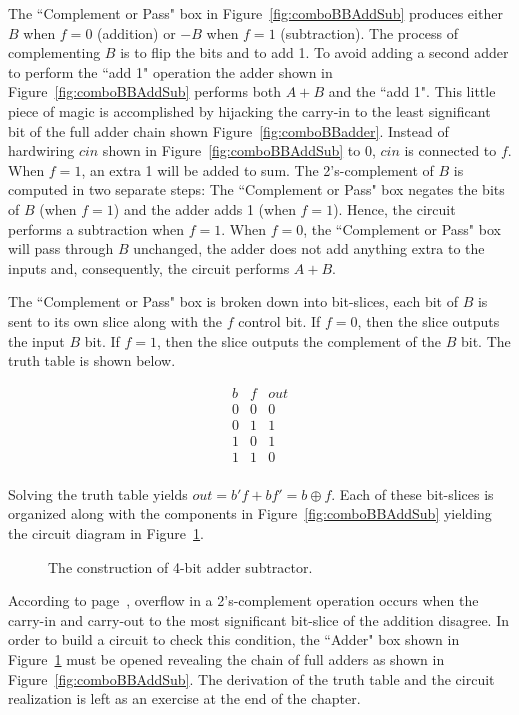 The ``Complement or Pass" box in Figure~\ref{fig:comboBBAddSub} produces 
either $B$ when $f=0$ (addition) or $-B$ when $f=1$ (subtraction).
The process of complementing $B$ is to flip the bits and to add 1.
To avoid adding a second adder to perform the ``add 1" 
operation the adder shown in Figure~\ref{fig:comboBBAddSub} performs 
both $A+B$ and the ``add 1".  This little piece of magic is 
accomplished by hijacking the carry-in to the least significant 
bit of the full adder chain shown Figure~\ref{fig:comboBBadder}.  Instead
of hardwiring $cin$ shown in Figure~\ref{fig:comboBBAddSub} to 0, $cin$ is 
connected to $f$.  
When $f=1$, an extra 1 will be added to sum. The 2's-complement of
$B$ is computed in two separate steps: The ``Complement or Pass" box 
negates the bits of $B$ (when $f=1$) and the adder adds 1
(when $f=1$). Hence, the circuit performs a subtraction when $f=1$.
When $f=0$, the ``Complement or Pass" box will pass through $B$
unchanged, the adder does not add anything extra to the inputs and,
consequently, the circuit performs $A+B$.

The ``Complement or Pass" box is broken down into bit-slices, each
bit of $B$ is sent to its own slice along with the $f$ control
bit.  If $f=0$, then the slice outputs the input $B$ bit.  If $f=1$, 
then the slice outputs the complement of the $B$ bit.
The truth table is shown below.

$$\begin{array}{c|c||c}
b & f & out \\ \hline
0 & 0 & 0 \\ \hline
0 & 1 & 1 \\ \hline
1 & 0 & 1 \\ \hline
1 & 1 & 0 \\
\end{array}$$

Solving the truth table yields $out = b'f + bf' = b \oplus f$.
Each of these bit-slices is organized along with the components
in Figure~\ref{fig:comboBBAddSub} yielding the circuit diagram in
Figure~\ref{fig:comboBBTotalAddSub}.


\begin{figure}[ht]
\caption{The construction of 4-bit adder subtractor.}
\label{fig:comboBBTotalAddSub}
\end{figure}
\label{page:as}


According to page~\pageref{page:Ovf}, overflow in a 2's-complement 
operation occurs when the carry-in and carry-out to the most
significant bit-slice of the addition disagree.  In order to 
build a circuit to check this condition, the ``Adder" box shown in 
Figure~\ref{fig:comboBBTotalAddSub} must be opened revealing
the chain of full adders as shown in Figure~\ref{fig:comboBBAddSub}.
The derivation of the truth table and the circuit realization
is left as an exercise at the end of the chapter.

